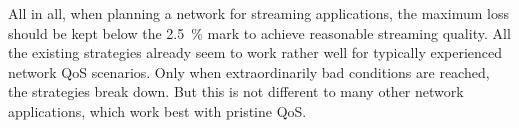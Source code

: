 All in all, when planning a network for streaming applications, the maximum loss should be kept below the \SI{2.5}{\percent} mark to achieve reasonable streaming quality. All the existing strategies already seem to work rather well for typically experienced network \gls{QoS} scenarios. Only when extraordinarily bad conditions are reached, the strategies break down. But this is not different to many other network applications, which work best with pristine \gls{QoS}.








